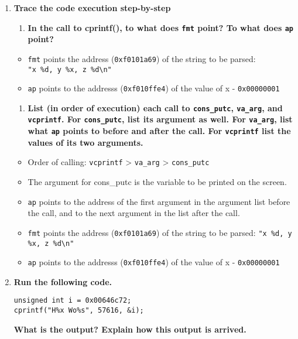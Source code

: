 \documentclass[]{article}
\begin{document}
\begin{enumerate}
\def\labelenumi{\arabic{enumi}.}
\setcounter{enumi}{2}
\item
  \textbf{Trace the code execution step-by-step}

  \begin{enumerate}
  \def\labelenumii{\roman{enumii}.}
  \itemsep1pt\parskip0pt
  \item
    \textbf{In the call to cprintf(), to what does \texttt{fmt} point?
    To what does \texttt{ap} point?}
  \end{enumerate}

  \begin{itemize}
  \itemsep1pt\parskip0pt
  \item
    \texttt{fmt} points the address (\texttt{0xf0101a69}) of the string
    to be parsed:\\ \texttt{"x \%d, y \%x, z \%d\textbackslash{}n"}
  \item
    \texttt{ap} points to the addresss (\texttt{0xf010ffe4}) of the
    value of x - \texttt{0x00000001}
  \end{itemize}

  \begin{enumerate}
  \def\labelenumii{\roman{enumii}.}
  \setcounter{enumii}{1}
  \itemsep1pt\parskip0pt
  \item
    \textbf{List (in order of execution) each call to
    \texttt{cons\_putc}, \texttt{va\_arg}, and \texttt{vcprintf}. For
    \texttt{cons\_putc}, list its argument as well. For
    \texttt{va\_arg}, list what \texttt{ap} points to before and after
    the call. For \texttt{vcprintf} list the values of its two
    arguments.}
  \end{enumerate}

  \begin{itemize}
  \itemsep1pt\parskip0pt
  \item
    Order of calling: \texttt{vcprintf} \textgreater{} \texttt{va\_arg}
    \textgreater{} \texttt{cons\_putc}
  \item
    The argument for cons\_putc is the variable to be printed on the
    screen.
  \item
    \texttt{ap} points to the address of the first argument in the
    argument list before the call, and to the next argument in the list
    after the call.
  \item
    \texttt{fmt} points the address (\texttt{0xf0101a69}) of the string
    to be parsed: \texttt{"x \%d, y \%x, z \%d\textbackslash{}n"}
  \item
    \texttt{ap} points to the addresss (\texttt{0xf010ffe4}) of the
    value of x - \texttt{0x00000001}
  \end{itemize}
\item
  \textbf{Run the following code.}

\begin{verbatim}
unsigned int i = 0x00646c72;
cprintf("H%x Wo%s", 57616, &i);
\end{verbatim}

  \textbf{What is the output? Explain how this output is arrived.}\\
\end{enumerate}
\end{document}
